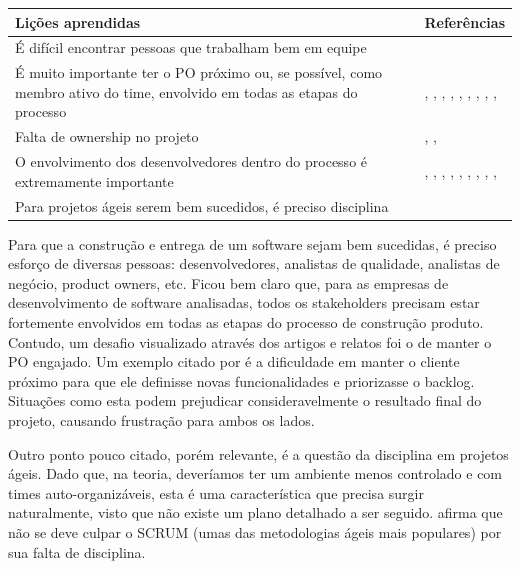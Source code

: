 \begin{table}[H]
	\centering
	\begin{tabularx}{\linewidth}{ | X | p{5cm} | } \hline \textbf{Lições aprendidas} & \textbf{Referências} \\ \hline
		É difícil encontrar pessoas que trabalham bem em equipe & \cite{Block2011} \\ \hline
		É muito importante ter o PO próximo ou, se possível, como membro ativo do time, envolvido em todas as etapas do processo & \cite{Block2011}, \cite{Asnawi2012}, \cite{Lapham2012}, \cite{Microsoft2013}, \cite{Claudia2013}, \cite{Piegas2012}, \cite{Parzinello2012}, \cite{Stefano2013}, \cite{Rodrigues2013}, \cite{Maciel2013} \\ \hline
		Falta de ownership no projeto & \cite{Block2011}, \cite{Nokia2013}, \cite{Queiroz2013} \\ \hline
		O envolvimento dos desenvolvedores dentro do processo é extremamente importante & \cite{Asnawi2012}, \cite{Adobe2012}, \cite{Fitzgerald2013}, \cite{Lapham2012}, \cite{Microsoft2013}, \cite{Claudia2013}, \cite{Stefano2013}, \cite{Bastos2013}, \cite{Maciel2013}, \cite{Ahmed2008} \\ \hline
		Para projetos ágeis serem bem sucedidos, é preciso disciplina & \cite{Parzinello2012} \\ \hline
	\end{tabularx}
\end{table}

%

Para que a construção e entrega de um software sejam bem sucedidas, é preciso esforço de diversas pessoas: desenvolvedores, analistas de qualidade, analistas de negócio, product owners, etc. Ficou bem claro que, para as empresas de desenvolvimento de software analisadas, todos os stakeholders precisam estar fortemente envolvidos em todas as etapas do processo de construção produto. Contudo, um desafio visualizado através dos artigos e relatos foi o de manter o PO engajado. Um exemplo citado por \cite{Block2011} é a dificuldade em manter o cliente próximo para que ele definisse novas funcionalidades e priorizasse o backlog. Situações como esta podem prejudicar consideravelmente o resultado final do projeto, causando frustração para ambos os lados.

Outro ponto pouco citado, porém relevante, é a questão da disciplina em projetos ágeis. Dado que, na teoria, deveríamos ter um ambiente menos controlado e com times auto-organizáveis, esta é uma característica que precisa surgir naturalmente, visto que não existe um plano detalhado a ser seguido. \cite{Parzinello2012} afirma que não se deve culpar o SCRUM (umas das metodologias ágeis mais populares) por sua falta de disciplina.


